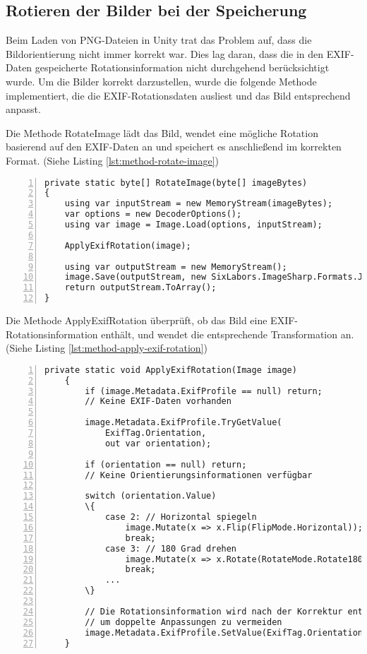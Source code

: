 \subsection{Rotieren der Bilder bei der Speicherung}

Beim Laden von PNG-Dateien in Unity trat das Problem auf, dass die Bildorientierung 
nicht immer korrekt war. Dies lag daran, dass die in den EXIF-Daten gespeicherte 
Rotationsinformation nicht durchgehend berücksichtigt wurde. Um die Bilder 
korrekt darzustellen, wurde die folgende Methode implementiert, die die 
EXIF-Rotationsdaten ausliest und das Bild entsprechend anpasst.

Die Methode RotateImage lädt das Bild, wendet eine mögliche Rotation 
basierend auf den EXIF-Daten an und speichert es anschlie\ss{}end im korrekten Format. 
(Siehe Listing \ref{lst:method-rotate-image})

\begin{lstlisting}[numbers=left,caption={Methode RotateImage},label={lst:method-rotate-image}]
private static byte[] RotateImage(byte[] imageBytes)
{
    using var inputStream = new MemoryStream(imageBytes);
    var options = new DecoderOptions();
    using var image = Image.Load(options, inputStream);
        
    ApplyExifRotation(image);
    
    using var outputStream = new MemoryStream();
    image.Save(outputStream, new SixLabors.ImageSharp.Formats.Jpeg.JpegEncoder());
    return outputStream.ToArray();
}    
\end{lstlisting}

Die Methode ApplyExifRotation überprüft, ob das Bild eine EXIF-Rotationsinformation enthält, 
und wendet die entsprechende Transformation an. 
(Siehe Listing \ref{lst:method-apply-exif-rotation})

\begin{lstlisting}[numbers=left,caption={Methode ApplyExifRotation},label={lst:method-apply-exif-rotation}]
    private static void ApplyExifRotation(Image image)
    {
        if (image.Metadata.ExifProfile == null) return; 
        // Keine EXIF-Daten vorhanden
                
        image.Metadata.ExifProfile.TryGetValue(
            ExifTag.Orientation, 
            out var orientation);
            
        if (orientation == null) return; 
        // Keine Orientierungsinformationen verfügbar
            
        switch (orientation.Value)
        \{
            case 2: // Horizontal spiegeln
                image.Mutate(x => x.Flip(FlipMode.Horizontal));
                break;
            case 3: // 180 Grad drehen
                image.Mutate(x => x.Rotate(RotateMode.Rotate180));
                break;
            ...
        \}
            
        // Die Rotationsinformation wird nach der Korrektur entfernt, 
        // um doppelte Anpassungen zu vermeiden
        image.Metadata.ExifProfile.SetValue(ExifTag.Orientation, (ushort)1);
    }    
\end{lstlisting}

